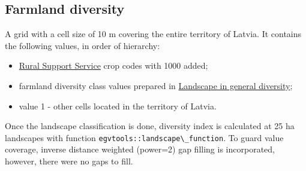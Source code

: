 \documentclass[
]{book}
\newcommand{\passthrough}[1]{#1}
\begin{document}
\subsection{Farmland diversity}\label{Ch05.04.03}

A grid with a cell size of 10 m covering the entire territory of Latvia. It
contains the following values, in order of hierarchy:

\begin{itemize}
\item
  \hyperref[Ch04.02]{Rural Support Service} crop codes with 1000 added;
\item
  farmland diversity class values prepared in \hyperref[Ch05.04.01]{Landscape in general diversity};
\item
  value 1 - other cells located in the territory of Latvia.
\end{itemize}

Once the landscape classification is done, diversity index is calculated at 25 ha
landscapes with function \passthrough{\lstinline!egvtools::landscape\_function!}. To guard value coverage,
inverse distance weighted (power=2) gap filling is incorporated, however,
there were no gaps to fill.
\end{document}
